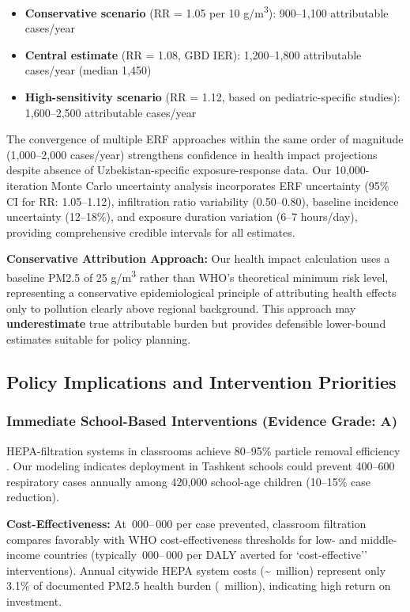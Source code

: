 \documentclass[11pt,a4paper]{article}
\begin{document}
\begin{itemize}
    \item \textbf{Conservative scenario} (RR = 1.05 per 10 \textmu g/m\textsuperscript{3}): 900--1,100 attributable cases/year
    \item \textbf{Central estimate} (RR = 1.08, GBD IER): 1,200--1,800 attributable cases/year (median 1,450)
    \item \textbf{High-sensitivity scenario} (RR = 1.12, based on pediatric-specific studies): 1,600--2,500 attributable cases/year
\end{itemize}

The convergence of multiple ERF approaches within the same order of magnitude (1,000--2,000 cases/year) strengthens confidence in health impact projections despite absence of Uzbekistan-specific exposure-response data. Our 10,000-iteration Monte Carlo uncertainty analysis incorporates ERF uncertainty (95\% CI for RR: 1.05--1.12), infiltration ratio variability (0.50--0.80), baseline incidence uncertainty (12--18\%), and exposure duration variation (6--7 hours/day), providing comprehensive credible intervals for all estimates.

\textbf{Conservative Attribution Approach:} Our health impact calculation uses a baseline PM2.5 of 25 \textmu g/m\textsuperscript{3} rather than WHO's theoretical minimum risk level, representing a conservative epidemiological principle of attributing health effects only to pollution clearly above regional background. This approach may \textbf{underestimate} true attributable burden but provides defensible lower-bound estimates suitable for policy planning.

\subsection{Policy Implications and Intervention Priorities}

\subsubsection{Immediate School-Based Interventions (Evidence Grade: A)}

HEPA-filtration systems in classrooms achieve 80--95\% particle removal efficiency \citep{macintosh2009residential}. Our modeling indicates deployment in Tashkent schools could prevent 400--600 respiratory cases annually among 420,000 school-age children (10--15\% case reduction).

\textbf{Cost-Effectiveness:} At \,000--\,000 per case prevented, classroom filtration compares favorably with WHO cost-effectiveness thresholds for low- and middle-income countries (typically \,000--\,000 per DALY averted for `cost-effective'' interventions). Annual citywide HEPA system costs (\textasciitilde\ million) represent only 3.1\% of documented PM2.5 health burden (\ million), indicating high return on investment.
\end{document}
